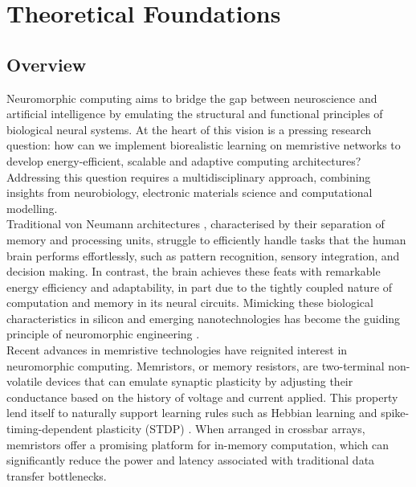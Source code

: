 
\chapter{Theoretical Foundations}  %

\section[Overview]{Overview}

Neuromorphic computing aims to bridge the gap between neuroscience and artificial intelligence by emulating the structural and functional principles of biological neural systems. At the heart of this vision is a pressing research question: how can we implement biorealistic learning on memristive networks to develop energy-efficient, scalable and adaptive computing architectures? Addressing this question requires a multidisciplinary approach, combining insights from neurobiology, electronic materials science and computational modelling. \\

\noindent Traditional von Neumann architectures \cite{von1993first}, characterised by their separation of memory and processing units, struggle to efficiently handle tasks that the human brain performs effortlessly, such as pattern recognition, sensory integration, and decision making. In contrast, the brain achieves these feats with remarkable energy efficiency and adaptability, in part due to the tightly coupled nature of computation and memory in its neural circuits. Mimicking these biological characteristics in silicon and emerging nanotechnologies has become the guiding principle of neuromorphic engineering \cite{saighi2015plasticity}. \\

\noindent Recent advances in memristive technologies have reignited interest in neuromorphic computing. Memristors, or memory resistors, are two-terminal non-volatile devices that can emulate synaptic plasticity by adjusting their conductance based on the history of voltage and current applied. This property lend itself to naturally support learning rules such as Hebbian learning \cite{hebb2005organization} and spike-timing-dependent plasticity (STDP) \cite{markram1997regulation}. When arranged in crossbar arrays, memristors offer a promising platform for in-memory computation, which can significantly reduce the power and latency associated with traditional data transfer bottlenecks. \\

